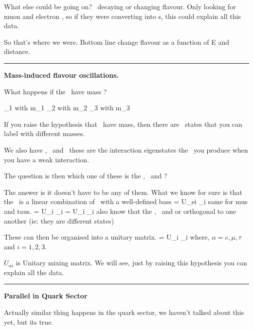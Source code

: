 {What else could be going on?
\nus\ decaying or changing flavour.
Only looking for muon and electron \nus, so if they were converting into \nutau s, this could explain all this data.




So that's where we were. 
Bottom line \nus change flavour as a function of E and distance. 

\noindent\rule{\textwidth}{1pt}

\textbf{Mass-induced flavour oscillations.}

What happens if the \nus\ have mass ?

\be
\nu_1 \textrm{ with } m_1
\ee
\be
\nu_2 \textrm{ with } m_2
\ee
\be
\nu_3 \textrm{ with } m_3
\ee

If you raise the hypothesis that \nus\ have mass, then there are \nus\ states that you can label with different masses.

We also have \nue, \numu\ and \nutau\ these are the interaction eigenstates the \nus\ you produce when you have a weak interaction. 

The question is then which one of these is the \nue, \numu\ and \nutau ?

The answer is it doesn't have to be any of them.
What we know for sure is that the \nue\ is a linear combination of \nus\ with a well-defined bass
\be
\nue = U_{ei} \nu_i
\ee
same for mus and taus. 
\be
\numu = U_{\mu i} \nu_i
\ee
\be
\nutau = U_{\tau i} \nu_i
\ee
also know that the \nue, \numu\ and \nutau or orthogonal to one another (ie: they are different states) 

These can then be organised into a unitary matrix. 
\be
\nualpha = U_{\alpha i} \nu_i
\ee
where, $\alpha = e, \mu, \tau$ and $i = 1,2,3$.

$U_{\alpha i}$ is Unitary mixing matrix.
We will see, just by raising this hypothesis you can explain all the data.

\noindent\rule{\textwidth}{1pt}
\textbf{Parallel in Quark Sector}

Actually similar thing happens in the quark sector, we haven't talked about this yet, but its true.

}

